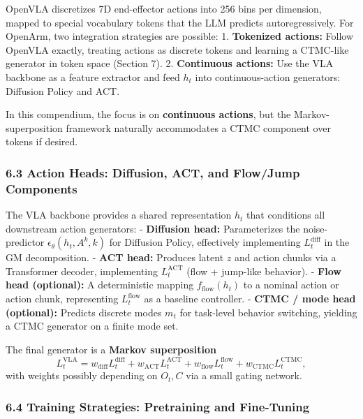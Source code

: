 \documentclass[
]{article}
\theoremstyle{remark}
\begin{document}
OpenVLA discretizes 7D end-effector actions into 256 bins per dimension,
mapped to special vocabulary tokens that the LLM predicts
autoregressively. For OpenArm, two integration strategies are
possible: \cite{openvla-notes} 1. \textbf{Tokenized actions:} Follow OpenVLA
exactly, treating actions as discrete tokens and learning a CTMC-like
generator in token space (Section 7). 2. \textbf{Continuous actions:}
Use the VLA backbone as a feature extractor and feed \(h_t\) into
continuous-action generators: Diffusion Policy and
ACT. \cite{diffpolicy-theory-notes,act-openarm-notes,openvla-notes}

In this compendium, the focus is on \textbf{continuous actions}, but the
Markov-superposition framework naturally accommodates a CTMC component
over tokens if desired. \cite{openvla-notes,gm2025}

\subsubsection{6.3 Action Heads: Diffusion, ACT, and Flow/Jump
Components}\label{action-heads-diffusion-act-and-flowjump-components}

The VLA backbone provides a shared representation \(h_t\) that
conditions all downstream action generators: \cite{openvla-notes} -
\textbf{Diffusion head:} Parameterizes the noise-predictor
\(\epsilon_\theta(h_t, A^k, k)\) for Diffusion Policy, effectively
implementing \(L_t^{\text{diff}}\) in the GM
decomposition. \cite{diffusion-policy2023,diffpolicy-theory-notes} - \textbf{ACT head:} Produces
latent \(z\) and action chunks via a Transformer decoder, implementing
\(L_t^{\text{ACT}}\) (flow + jump-like
behavior). \cite{act2023,act-project-page,act-openarm-notes} - \textbf{Flow head
(optional):} A deterministic mapping \(f_{\text{flow}}(h_t)\) to a
nominal action or action chunk, representing \(L_t^{\text{flow}}\) as a
baseline controller. - \textbf{CTMC / mode head (optional):} Predicts
discrete modes \(m_t\) for task-level behavior switching, yielding a
CTMC generator on a finite mode set. \cite{lecnotes2026,gm2025}

The final generator is a \textbf{Markov superposition} \[
L_t^{\text{VLA}} = w_{\text{diff}} L_t^{\text{diff}} + w_{\text{ACT}} L_t^{\text{ACT}} + w_{\text{flow}} L_t^{\text{flow}} + w_{\text{CTMC}} L_t^{\text{CTMC}},
\] with weights possibly depending on \(O_t, C\) via a small gating
network. \cite{gm2025,openvla-notes}

\subsubsection{6.4 Training Strategies: Pretraining and
Fine-Tuning}\label{training-strategies-pretraining-and-fine-tuning}
\end{document}

